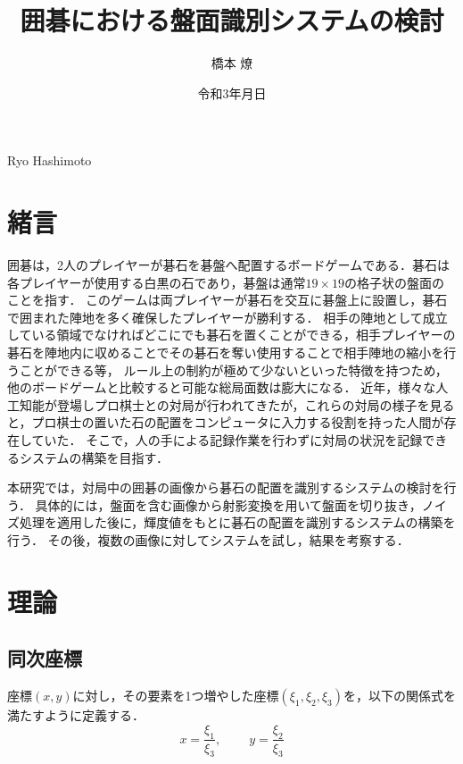 \documentclass[summary]{nitocs}
\numberwithin{equation}{section}
\begin{document}
    \title{囲碁における盤面識別システムの検討}
    \author{橋本 燎}{Ryo Hashimoto} %

    \date{令和3年\number\month 月\number\day 日} 

    \maketitle
    \section{緒言} \label{intro}
        囲碁は，2人のプレイヤーが碁石を碁盤へ配置するボードゲームである．碁石は各プレイヤーが使用する白黒の石であり，碁盤は通常$19\times19$の格子状の盤面のことを指す．
        このゲームは両プレイヤーが碁石を交互に碁盤上に設置し，碁石で囲まれた陣地を多く確保したプレイヤーが勝利する．
        相手の陣地として成立している領域でなければどこにでも碁石を置くことができる，相手プレイヤーの碁石を陣地内に収めることでその碁石を奪い使用することで相手陣地の縮小を行うことができる等，
        ルール上の制約が極めて少ないといった特徴を持つため，他のボードゲームと比較すると可能な総局面数は膨大になる．        
        近年，様々な人工知能が登場しプロ棋士との対局が行われてきたが，これらの対局の様子を見ると，プロ棋士の置いた石の配置をコンピュータに入力する役割を持った人間が存在していた．
        そこで，人の手による記録作業を行わずに対局の状況を記録できるシステムの構築を目指す．

        本研究では，対局中の囲碁の画像から碁石の配置を識別するシステムの検討を行う．
        具体的には，盤面を含む画像から射影変換を用いて盤面を切り抜き，ノイズ処理を適用した後に，輝度値をもとに碁石の配置を識別するシステムの構築を行う．
        その後，複数の画像に対してシステムを試し，結果を考察する．

    \section{理論} \label{theory}
        \subsection{同次座標}
            座標$(x,y)$に対し，その要素を1つ増やした座標$(\xi_1,\xi_2,\xi_3)$を，以下の関係式を満たすように定義する．\\
            \begin{equation} %
                    x = \frac{\xi_1}{\xi_3}, \;\;\;\;\;\;\;\; y = \frac{\xi_2}{\xi_3}
                \label{Homogeneous}
            \end{equation}
\end{document}
